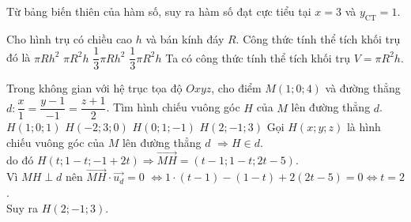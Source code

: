 \begin{ex}%
	{}
	\loigiai
	{Từ bảng biến thiên của hàm số, suy ra hàm số đạt cực tiểu tại $x=3$ và $y_{\text{CT}}=1$.}
\end{ex}
\begin{ex}%
	Cho hình trụ có chiều cao $h$ và bán kính đáy $R$. Công thức tính thể tích khối trụ đó là 
	\choice
	{$\pi R h^2$}
	{\True$\pi R^2 h$}
	{$\dfrac{1}{3}\pi R h^2$}
	{$\dfrac{1}{3}\pi R^2 h$}
	\loigiai
	{Ta có công thức tính thể tích khối trụ $V=\pi R^2 h$.}
\end{ex}
\begin{ex}%
	{}
\end{ex}
\begin{ex}%
	Trong không gian với hệ trục tọa độ $Oxyz$, cho điểm $M(1;0;4)$ và đường thẳng $d \colon\dfrac{x}{1}=\dfrac{y-1}{-1}=\dfrac{z+1}{2}$. Tìm hình chiếu vuông góc $H$ của $M$ lên đường thẳng $d$.
	\choice
	{$H(1;0;1)$}
	{$H(-2;3;0)$}
	{$H(0;1;-1)$}
	{\True $H(2;-1;3)$}
	\loigiai
	{Gọi $H(x;y;z)$ là hình chiếu vuông góc của $M$ lên đường thẳng $d$ $\Rightarrow H\in d$.\\
		do đó $H(t;1-t;-1+2t)\Rightarrow \overrightarrow{MH}=(t-1;1-t;2t-5)$.\\
		Vì $MH\perp d$ nên $\overrightarrow{MH}\cdot\overrightarrow{u_{d}}=0$
		$\Leftrightarrow 1\cdot(t-1)-(1-t)+2(2t-5)=0\Leftrightarrow t=2$.\\
		Suy ra $H\left(2;-1;3\right).$}
\end{ex}

